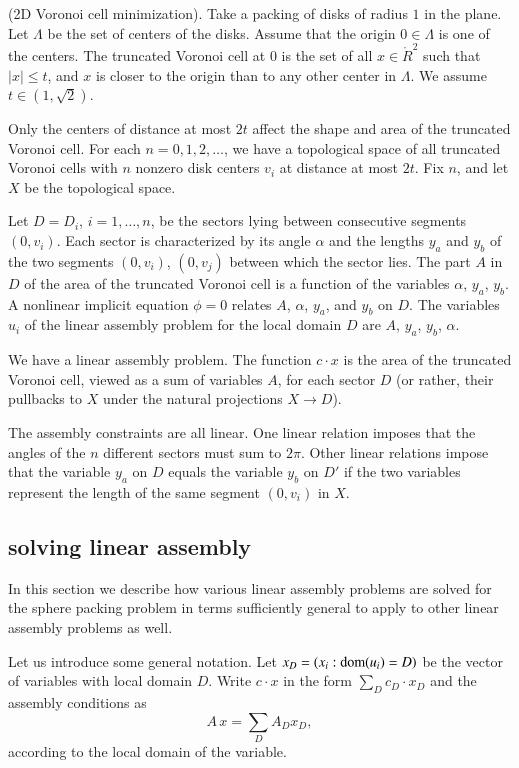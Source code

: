 \begin{example} (2D Voronoi cell minimization). Take a packing of disks of
radius $1$ in the plane.  Let $\Lambda$ be the set of centers of
the disks.  Assume that the origin $0\in\Lambda$ is one of the
centers. The truncated Voronoi cell at $0$ is the set of all
$x\in\ring{R}^2$ such that $|x|\le t$, and $x$ is closer to the
origin than to any other center in $\Lambda$.  We assume
$t\in(1,\sqrt2)$.

Only the centers of distance at most $2t$ affect the shape and
area of the truncated Voronoi cell.  For each $n=0,1,2,\ldots$, we
have a topological space of all truncated Voronoi cells with $n$
nonzero disk centers $v_i$ at distance at most $2t$.  Fix $n$, and
let $X$ be the topological space.

Let $D=D_i$, $i=1,\ldots,n$,  be the sectors lying between
consecutive segments $(0,v_i)$.  Each sector is characterized by
its angle $\alpha$ and the lengths $y_a$ and $y_b$ of the two
segments $(0,v_i)$, $(0,v_j)$ between which the sector lies.  The
part $A$ in $D$ of the area of the truncated Voronoi cell is a
function of the variables $\alpha$, $y_a$, $y_b$.  A nonlinear
implicit equation $\phi=0$ relates $A$, $\alpha$, $y_a$, and $y_b$
on $D$. The variables $u_i$ of the linear assembly problem for the
local domain $D$ are $A$, $y_a$, $y_b$, $\alpha$.


We have a linear assembly problem.  The function $c\cdot x$ is the
area of the truncated Voronoi cell, viewed as a sum of variables
$A$, for each sector $D$ (or rather, their pullbacks to $X$ under
the natural projections $X\to D$).

The assembly constraints are all linear. One linear relation
imposes that the angles of the $n$ different sectors must sum to
$2\pi$. Other linear relations impose that the variable $y_a$ on
$D$ equals the variable $y_b$ on $D'$ if the two variables
represent the length of the same segment $(0,v_i)$ in $X$.
\end{example}


\subsection{solving linear assembly}

In this section we describe how various linear assembly problems
are solved for the sphere packing problem in terms
sufficiently general to apply to other linear assembly problems as
well.

Let us introduce some general notation.  Let $x_D = (x_i:
{\operatorname{dom}}(u_i)=D)$ be the vector of variables with local domain
$D$. Write $c\cdot x$ in the form $\sum_D c_D\cdot x_D$ and the
assembly conditions as
$$A \,x =\sum_D A_D x_D,$$
according to the local domain of the variable.


